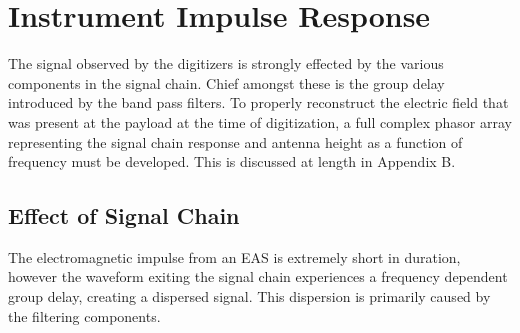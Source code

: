 \section{Instrument Impulse Response}
		The signal observed by the digitizers is strongly effected by the various components in the signal chain.  Chief amongst these is the group delay introduced by the band pass filters.  To properly reconstruct the electric field that was present at the payload at the time of digitization, a full complex phasor array representing the signal chain response and antenna height as a function of frequency must be developed.  This is discussed at length in Appendix B.
		
	\subsection{Effect of Signal Chain}
		The electromagnetic impulse from an EAS is extremely short in duration, however the waveform exiting the signal chain experiences a frequency dependent group delay, creating a dispersed signal.  This dispersion is primarily caused by the filtering components.  
		
